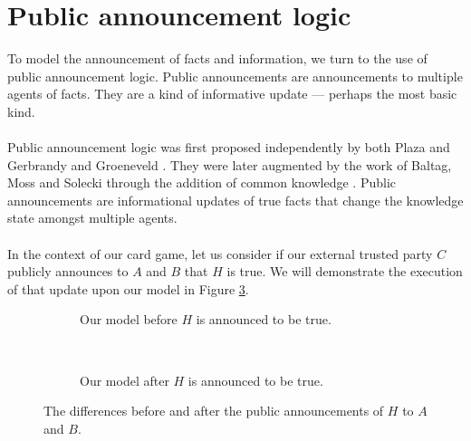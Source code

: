 \section{Public announcement logic}\label{pal}
To model the announcement of facts and information, we turn to the use of public
announcement logic.
Public announcements are announcements to multiple agents of facts.
They are a kind of informative update --- perhaps the most basic kind.\\
\\
Public announcement logic was first proposed independently by both Plaza and
Gerbrandy and Groeneveld \cite{plaza2007public,gelbrandy1997reasoning}.
They were later augmented by the work of Baltag, Moss and Solecki through the
addition of common knowledge \cite{baltag1998lpa}.
Public announcements are informational updates of true facts that change the
knowledge state amongst multiple agents.\\
\\
In the context of our card game, let us consider if our external trusted party
$C$ publicly announces to $A$ and $B$ that $H$ is true.
We will demonstrate the execution of that update upon our model in Figure
\ref{pakripkefigure}.

\begin{figure}[ht!]
\centering
\begin{subfigure}[b]{.45\textwidth}
\centering
{}
\caption{Our model before $H$ is announced to be true.}
\label{beforefigure}
\end{subfigure}
~
\begin{subfigure}[b]{.45\textwidth}
\centering
{}
\caption{Our model after $H$ is announced to be true.}
\label{afterfigure}
\end{subfigure}
\caption[Public announcement: before and after]{The differences before and after the public announcements of $H$ to $A$ and
	$B$.}
\label{pakripkefigure}
\end{figure}

